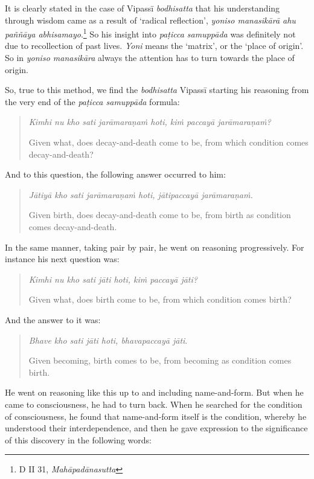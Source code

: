 It is clearly stated in the case of Vipassī \emph{bodhisatta} that his understanding through wisdom came as a result of `radical reflection', \emph{yoniso manasikārā ahu paññāya abhisamayo}.\footnote{D II 31, \emph{Mahāpadānasutta}} So his insight into \emph{paṭicca samuppāda} was definitely not due to recollection of past lives. \emph{Yoni} means the `matrix', or the `place of origin'. So in \emph{yoniso manasikāra} always the attention has to turn towards the place of origin.

So, true to this method, we find the \emph{bodhisatta} Vipassī starting his reasoning from the very end of the \emph{paṭicca samuppāda} formula:

\begin{quote}
\emph{Kimhi nu kho sati jarāmaraṇaṁ hoti, kiṁ paccayā jarāmaraṇaṁ?}

Given what, does decay-and-death come to be, from which condition comes decay-and-death?
\end{quote}

And to this question, the following answer occurred to him:

\begin{quote}
\emph{Jātiyā kho sati jarāmaraṇaṁ hoti, jātipaccayā jarāmaraṇaṁ.}

Given birth, does decay-and-death come to be, from birth as condition comes decay-and-death.
\end{quote}

In the same manner, taking pair by pair, he went on reasoning progressively. For instance his next question was:

\begin{quote}
\emph{Kimhi nu kho sati jāti hoti, kiṁ paccayā jāti?}

Given what, does birth come to be, from which condition comes birth?
\end{quote}

And the answer to it was:

\begin{quote}
\emph{Bhave kho sati jāti hoti, bhavapaccayā jāti}.

Given becoming, birth comes to be, from becoming as condition comes birth.
\end{quote}

He went on reasoning like this up to and including name-and-form. But when he came to consciousness, he had to turn back. When he searched for the condition of consciousness, he found that name-and-form itself is the condition, whereby he understood their interdependence, and then he gave expression to the significance of this discovery in the following words:

